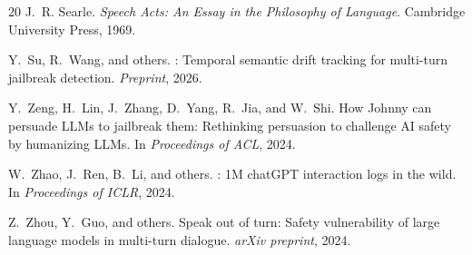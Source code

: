\documentclass[11pt,a4paper]{article}
\begin{document}
\begin{thebibliography}{20}
J.~R. Searle.
\newblock \emph{Speech Acts: An Essay in the Philosophy of Language}.
\newblock Cambridge University Press, 1969.

Y.~Su, R.~Wang, and others.
: Temporal semantic drift tracking for multi-turn jailbreak detection.
\newblock \emph{Preprint}, 2026.

Y.~Zeng, H.~Lin, J.~Zhang, D.~Yang, R.~Jia, and W.~Shi.
\newblock How {J}ohnny can persuade {LLMs} to jailbreak them: Rethinking persuasion to challenge {AI} safety by humanizing {LLMs}.
\newblock In \emph{Proceedings of ACL}, 2024.

W.~Zhao, J.~Ren, B.~Li, and others.
: 1{M} chat{GPT} interaction logs in the wild.
\newblock In \emph{Proceedings of ICLR}, 2024.

Z.~Zhou, Y.~Guo, and others.
\newblock Speak out of turn: Safety vulnerability of large language models in multi-turn dialogue.
\newblock \emph{arXiv preprint}, 2024.

\end{thebibliography}
\end{document}
